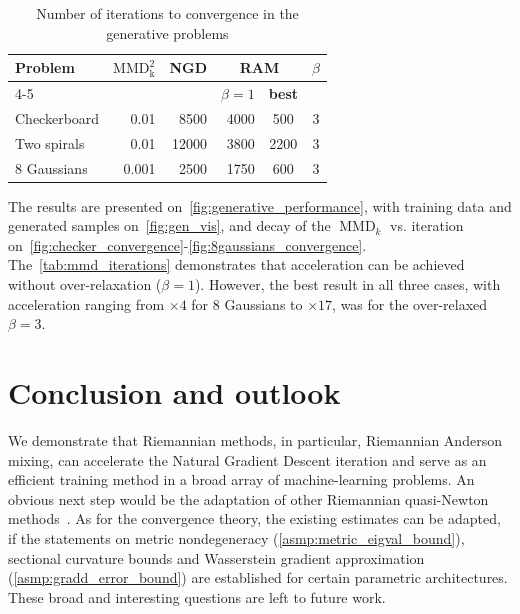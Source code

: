 \documentclass{article} %
\numberwithin{equation}{subsection}
\numberwithin{theorem}{section}
\begin{document}
    \begin{table}[hb]
        \centering
        \begin{tabular}{lrrrcc}
            \textbf{Problem} &
            \textbf{$\operatorname{MMD_k^2}$} &
            \textbf{NGD} &
            \multicolumn{2}{c}{\textbf{RAM}} &
            \textbf{$\beta$} \\
            \cline{4-5}
            & & &
            \textbf{$\beta = 1$} &
            \textbf{best} &
            \\
            \hline
            Checkerboard & 0.01  & 8500  & 4000 & 500  & 3 \\
            Two spirals  & 0.01  & 12000 & 3800 & 2200 & 3 \\
            8 Gaussians  & 0.001 & 2500  & 1750 & 600  & 3 \\
            \end{tabular}
        \vspace{5pt}
        \caption{Number of iterations to convergence in the generative problems}
        \label{tab:mmd_iterations}
    \end{table}
    
    The results are presented on~\autoref{fig:generative_performance}, with training data and generated samples on~\autoref{fig:gen_vis}, and decay of the $\operatorname{MMD}_k$ vs. iteration on~\autoref{fig:checker_convergence}-\ref{fig:8gaussians_convergence}.
    The~\autoref{tab:mmd_iterations} demonstrates that  acceleration can be achieved without over-relaxation ($\beta = 1$). 
    However, the best result in all three cases, with acceleration ranging from $\times 4$ for 8 Gaussians to $\times 17$, was for the over-relaxed $\beta = 3$.

   
\section{Conclusion and outlook}
    We demonstrate that Riemannian methods, in particular, Riemannian Anderson mixing, can accelerate the Natural Gradient Descent iteration and  serve as an efficient training method in a broad array of machine-learning problems.
    An obvious next step would be the adaptation of other Riemannian quasi-Newton methods~\cite{huang2015broyden,hu2018adaptive,huang2018riemannian,kasai2018riemannian,narushima2023memoryless}.
    As for the convergence theory, the existing estimates can be adapted, if the statements on metric nondegeneracy (\autoref{asmp:metric_eigval_bound}), sectional curvature bounds and Wasserstein gradient approximation (\autoref{asmp:gradd_error_bound}) are established for certain parametric architectures.
    These broad and interesting questions are left to future work.
\end{document}
